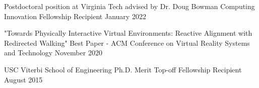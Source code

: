 
\begin{cventries}
  \cventry
    {Postdoctoral position at Virginia Tech advised by Dr. Doug Bowman} %
    {Computing Innovation Fellowship Recipient} %
    {January 2022} %
    {} %
    {}
    \vspace{-0.15in}
    
  \cventry
    {"Towards Physically Interactive Virtual Environments: Reactive Alignment with Redirected Walking"} %
    {Best Paper - ACM Conference on Virtual Reality Systems and Technology} %
    {November 2020} %
    {} %
    {}
    \vspace{-0.15in}
    
  \cventry
    {USC Viterbi School of Engineering} %
    {Ph.D. Merit Top-off Fellowship Recipient} %
    {August 2015} %
    {} %
    {}
    \vspace{-0.15in}
\end{cventries}